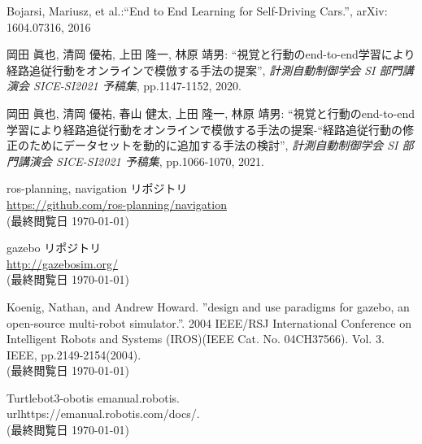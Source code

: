 \documentclass[10pt]{ujarticle}
\begin{document}
    \vspace{5truemm}
    {\footnotesize
        \begin{thebibliography}{99}

            Bojarsi, Mariusz, et al.:``End to End Learning for Self-Driving Cars.'', arXiv: 1604.07316, 2016
            
            岡田 眞也, 清岡 優祐, 上田 隆一, 林原 靖男: ``視覚と行動のend-to-end学習により経路追従行動をオンラインで模倣する手法の提案'', \textit{計測自動制御学会 SI 部門講演会 SICE-SI2021 予稿集}, pp.1147-1152, 2020.

            岡田 眞也, 清岡 優祐, 春山 健太, 上田 隆一, 林原 靖男: ``視覚と行動のend-to-end学習により経路追従行動をオンラインで模倣する手法の提案-“経路追従行動の修正のためにデータセットを動的に追加する手法の検討'', \textit{計測自動制御学会 SI 部門講演会 SICE-SI2021 予稿集}, pp.1066-1070, 2021.


            ros-planning, navigation リポジトリ\\
            \url{https://github.com/ros-planning/navigation}\\
            (最終閲覧日 \today)

            gazebo リポジトリ\\
            \url{http://gazebosim.org/}\\
            (最終閲覧日 \today)

            Koenig, Nathan, and Andrew Howard. ”design and use paradigms for gazebo, an open-source multi-robot simulator.”. 2004 IEEE/RSJ International Conference on Intelligent Robots and Systems (IROS)(IEEE Cat. No. 04CH37566). Vol. 3. IEEE, pp.2149-2154(2004).\\
            (最終閲覧日 \today)

            Turtlebot3-obotis emanual.robotis.\\
            url{https://emanual.robotis.com/docs/.}\\
            (最終閲覧日 \today)
            
        \end{thebibliography}
    }
\end{document}
